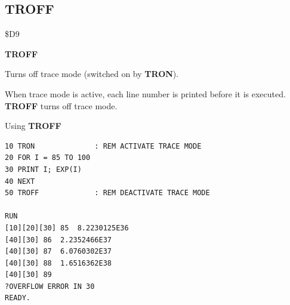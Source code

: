 \subsection{TROFF}
\begin{description}[leftmargin=2cm,style=nextline]
\item [Token:]    \$D9

\item [Format:]   {\bf TROFF}

\item [Usage:]    Turns off trace mode (switched on by {\bf TRON}).

                  When trace mode is active, each line number is printed before it is executed. {\bf TROFF} turns off trace mode.

\item [Example:]  Using {\bf TROFF}

\begin{tcolorbox}[colback=black,coltext=white]
\verbatimfont{\codefont}
\begin{verbatim}
10 TRON              : REM ACTIVATE TRACE MODE
20 FOR I = 85 TO 100
30 PRINT I; EXP(I)
40 NEXT
50 TROFF             : REM DEACTIVATE TRACE MODE

RUN
[10][20][30] 85  8.2230125E36
[40][30] 86  2.2352466E37
[40][30] 87  6.0760302E37
[40][30] 88  1.6516362E38
[40][30] 89
?OVERFLOW ERROR IN 30
READY.
\end{verbatim}
\end{tcolorbox}
\end{description}


\newpage
